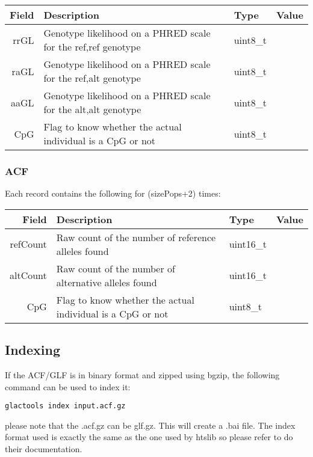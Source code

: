 \documentclass[a4paper]{article}
\begin{document}
\noindent \begin{tabular}{|r|p{6cm}|l|l|}
\hline
{\bf Field} & {\bf Description} & {\bf Type} & {\bf Value} \\
\hline
rrGL & Genotype likelihood on a PHRED scale for the ref,ref genotype & uint8\_t &  \\
\hline
raGL & Genotype likelihood on a PHRED scale for the ref,alt genotype & uint8\_t &  \\
\hline
aaGL & Genotype likelihood on a PHRED scale for the alt,alt genotype & uint8\_t &  \\
\hline
CpG & Flag to know whether the actual individual is a CpG or not & uint8\_t &  \\
\hline
\end{tabular}


\clearpage



\subsubsection{ACF}

\noindent Each record contains the following for (sizePops+2) times:

\noindent \begin{tabular}{|r|p{6cm}|l|l|}
\hline
{\bf Field} & {\bf Description} & {\bf Type} & {\bf Value} \\
\hline
refCount & Raw count of the number of reference alleles found & uint16\_t &  \\
\hline
altCount & Raw count of the number of alternative alleles found & uint16\_t &  \\
\hline
CpG & Flag to know whether the actual individual is a CpG or not & uint8\_t &  \\
\hline
\end{tabular}

\afterpage{\clearpage}



\subsection{Indexing}

\noindent If the ACF/GLF is in binary format and zipped using bgzip, the following command can be used to index it:
\begin{lstlisting}
glactools index input.acf.gz
\end{lstlisting}
\noindent please note that the .acf.gz can be glf.gz. This will create a .bai file. The index format used is exactly the same as the one used by htslib so please refer to do their documentation.
\end{document}
